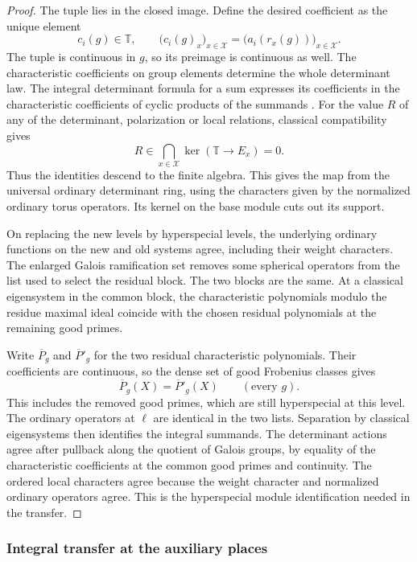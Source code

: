 \begin{proof}
The tuple lies in the closed
image. Define the desired coefficient as the unique element
\[
 c_i(g)\in\mathbb T,\qquad
      \bigl(c_i(g)_x\bigr)_{x\in\mathcal X}
        =\bigl(a_i(r_x(g))\bigr)_{x\in\mathcal X}.
\] The tuple is continuous in \(g\), so its
preimage is continuous as well. The characteristic
coefficients on group elements determine the
whole determinant law. The integral determinant
formula for a sum expresses its coefficients in
the characteristic coefficients of cyclic products
of the summands \cite[Section 1]{chenevier}.
For the value \(R\) of any of the determinant, polarization or local relations, classical compatibility gives
\[
 R\in\bigcap_{x\in\mathcal X}\ker(\mathbb T\to E_x)=0 .
\]
Thus the identities descend to the finite algebra. This gives the
map from the universal ordinary determinant ring,
using the characters given by the normalized
ordinary torus operators. Its kernel on the base
module cuts out its support.

On replacing the new levels by hyperspecial
levels, the underlying ordinary functions on the
new and old systems agree, including their weight
characters. The enlarged Galois ramification set
removes some spherical operators from the list
used to select the residual block. The two blocks
are the same. At a classical eigensystem in the
common block, the characteristic polynomials modulo
the residue maximal ideal coincide with the
chosen residual polynomials at the remaining good
primes.

Write \(\overline P_g\) and \(\overline P'_g\) for the two residual characteristic polynomials. Their coefficients are continuous, so the dense set of good Frobenius classes gives
\[
 \overline P_g(X)=\overline P'_g(X)\qquad(\text{every }g).
\]
This includes the removed good primes, which are still hyperspecial at this level. The ordinary operators at \(\ell\)
are identical in the two lists. Separation by
classical eigensystems then identifies the integral
summands. The determinant actions agree after
pullback along the quotient of Galois groups,
by equality of the characteristic coefficients
at the common good primes and continuity.
The ordered local characters agree because the
weight character and normalized ordinary
operators agree. This is the hyperspecial module
identification needed in the transfer.

\end{proof}

\subsubsection{Integral transfer at the auxiliary places}
\label{par:ordinary-level}

